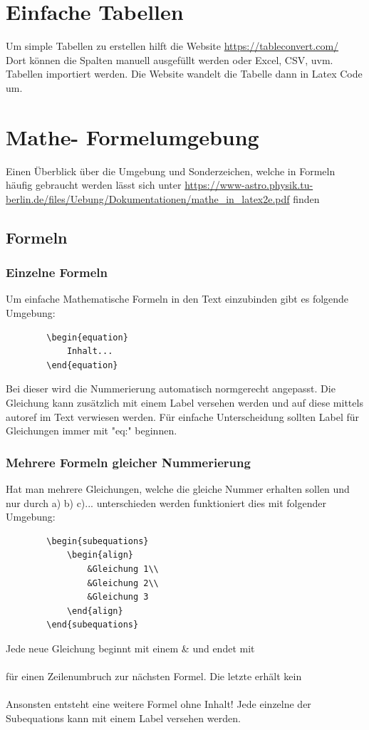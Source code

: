 	
	
	\newpage
	\section{Einfache Tabellen}
	Um simple Tabellen zu erstellen hilft die Website \url{https://tableconvert.com/}\\
	Dort können die Spalten manuell ausgefüllt werden oder Excel, CSV, uvm. Tabellen importiert werden. Die Website wandelt die Tabelle dann in Latex Code um.



	
	\newpage
	\section{Mathe- Formelumgebung}
	Einen Überblick über die Umgebung und Sonderzeichen, welche in Formeln häufig gebraucht werden lässt sich unter \url{https://www-astro.physik.tu-berlin.de/files/Uebung/Dokumentationen/mathe_in_latex2e.pdf} finden
	\subsection{Formeln}
	\subsubsection{Einzelne Formeln}
	Um einfache Mathematische Formeln in den Text einzubinden gibt es folgende Umgebung:
	\begin{verbatim}
		\begin{equation}
			Inhalt...
		\end{equation}
	\end{verbatim}
	Bei dieser wird die Nummerierung automatisch normgerecht angepasst. Die Gleichung kann zusätzlich mit einem Label versehen werden und auf diese mittels autoref im Text verwiesen werden. Für einfache Unterscheidung sollten Label für Gleichungen immer mit "eq:" beginnen.
	\subsubsection{Mehrere Formeln gleicher Nummerierung}
	Hat man mehrere Gleichungen, welche die gleiche Nummer erhalten sollen und nur durch a) b) c)... unterschieden werden funktioniert dies mit folgender Umgebung:
	\begin{verbatim}
		\begin{subequations}
			\begin{align}
				&Gleichung 1\\
				&Gleichung 2\\
				&Gleichung 3
			\end{align}
		\end{subequations}
	\end{verbatim}
	Jede neue Gleichung beginnt mit einem \& und endet mit \\\\ für einen Zeilenumbruch zur nächsten Formel. Die letzte erhält kein \\\\ Ansonsten entsteht eine weitere Formel ohne Inhalt! \newline
	Jede einzelne der Subequations kann mit einem Label versehen werden.

